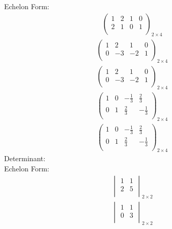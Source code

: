 \documentclass{article}
\begin{document}
Echelon Form:\\
\begin{align*}
\left(
\begin{array}{cc|cc}
1 & 2 & 1 & 0\\
2 & 1 & 0 & 1\\
\end{array}
\right)_{2\times 4}
\end{align*}
\begin{align*}
\left(
\begin{array}{cc|cc}
1 & 2 & 1 & 0\\
0 & -3 & -2 & 1\\
\end{array}
\right)_{2\times 4}
\end{align*}
\begin{align*}
\left(
\begin{array}{cc|cc}
1 & 2 & 1 & 0\\
0 & -3 & -2 & 1\\
\end{array}
\right)_{2\times 4}
\end{align*}
\begin{align*}
\left(
\begin{array}{cc|cc}
1 & 0 & -\frac{1}{3} & \frac{2}{3}\\
0 & 1 & \frac{2}{3} & -\frac{1}{3}\\
\end{array}
\right)_{2\times 4}
\end{align*}
\begin{align*}
\left(
\begin{array}{cc|cc}
1 & 0 & -\frac{1}{3} & \frac{2}{3}\\
0 & 1 & \frac{2}{3} & -\frac{1}{3}\\
\end{array}
\right)_{2\times 4}
\end{align*}
Determinant:\\
Echelon Form:\\
\begin{align*}
\begin{vmatrix}
1 & 1\\
2 & 5\\
\end{vmatrix}_{2\times 2}
\end{align*}
\begin{align*}
\begin{vmatrix}
1 & 1\\
0 & 3\\
\end{vmatrix}_{2\times 2}
\end{align*}
\end{document}
